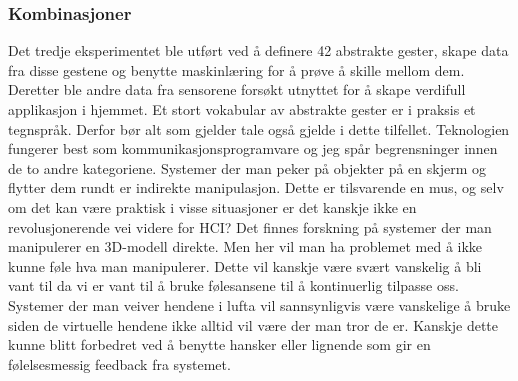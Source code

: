 \subsubsection*{Kombinasjoner}
Det tredje eksperimentet ble utført ved å definere 42 abstrakte gester, skape data fra disse gestene og benytte maskinlæring for å prøve å skille mellom dem. Deretter ble andre data fra sensorene forsøkt utnyttet for å skape verdifull applikasjon i hjemmet. Et stort vokabular av abstrakte gester er i praksis et tegnspråk. Derfor bør alt som gjelder tale også gjelde i dette tilfellet. Teknologien fungerer best som kommunikasjonsprogramvare og jeg spår begrensninger innen de to andre kategoriene. Systemer der man peker på objekter på en skjerm og flytter dem rundt er indirekte manipulasjon. Dette er tilsvarende en mus, og selv om det kan være praktisk i visse situasjoner er det kanskje ikke en revolusjonerende vei videre for HCI? Det finnes forskning på systemer der man manipulerer en 3D-modell direkte. Men her vil man ha problemet med å ikke kunne føle hva man manipulerer. Dette vil kanskje være svært vanskelig å bli vant til da vi er vant til å bruke følesansene til å kontinuerlig tilpasse oss. Systemer der man veiver hendene i lufta vil sannsynligvis være vanskelige å bruke siden de virtuelle hendene ikke alltid vil være der man tror de er. Kanskje dette kunne blitt forbedret ved å benytte hansker eller lignende som gir en følelsesmessig feedback fra systemet.

